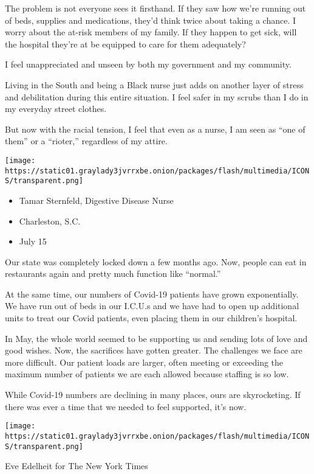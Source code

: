 The problem is not everyone sees it firsthand. If they saw how we're
running out of beds, supplies and medications, they'd think twice about
taking a chance. I worry about the at-risk members of my family. If they
happen to get sick, will the hospital they're at be equipped to care for
them adequately?

I feel unappreciated and unseen by both my government and my community.

Living in the South and being a Black nurse just adds on another layer
of stress and debilitation during this entire situation. I feel safer in
my scrubs than I do in my everyday street clothes.

But now with the racial tension, I feel that even as a nurse, I am seen
as ``one of them'' or a ``rioter,'' regardless of my attire.

\texttt{[image: https://static01.graylady3jvrrxbe.onion/packages/flash/multimedia/ICONS/transparent.png]}

\begin{itemize}
\tightlist
\item
  Tamar Sternfeld, Digestive Disease Nurse
\item
  Charleston, S.C.
\item
  July 15
\end{itemize}

Our state was completely locked down a few months ago. Now, people can
eat in restaurants again and pretty much function like ``normal.''

At the same time, our numbers of Covid-19 patients have grown
exponentially. We have run out of beds in our I.C.U.s and we have had to
open up additional units to treat our Covid patients, even placing them
in our children's hospital.

In May, the whole world seemed to be supporting us and sending lots of
love and good wishes. Now, the sacrifices have gotten greater. The
challenges we face are more difficult. Our patient loads are larger,
often meeting or exceeding the maximum number of patients we are each
allowed because staffing is so low.

While Covid-19 numbers are declining in many places, ours are
skyrocketing. If there was ever a time that we needed to feel supported,
it's now.

\texttt{[image: https://static01.graylady3jvrrxbe.onion/packages/flash/multimedia/ICONS/transparent.png]}

Eve Edelheit for The New York Times

